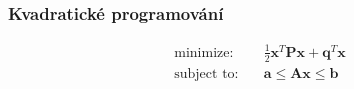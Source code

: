 \begin{frame}
	\frametitle{Kvadratické programování}
	\begin{align*}
		\text{minimize:}& \quad \frac{1}{2}\bm{x}^T\!\bm{P}\bm{x} + \bm{q}^T\!\bm{x} \\ 
		\text{subject to:}& \quad \bm{a} \leq \bm{A}\bm{x} \leq \bm{b}
	\end{align*}
\end{frame}